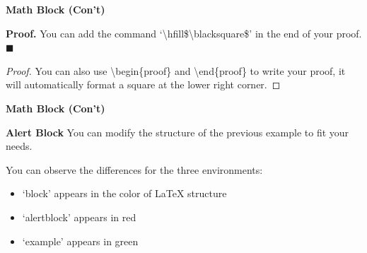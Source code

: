 \documentclass[12pt, aspectratio=169]{beamer}
\begin{document}

\linespread{1}
\begin{frame}{\textbf{Math Block (Con't)}}
\linespread{1.5} 

	\begin{block}{\textbf{Proof.}} 
		You can add the command `\textbackslash hfill\$\textbackslash blacksquare\$' in the end of your proof.
		\hfill$\blacksquare$
	\end{block}
	
	\begin{proof}
		You can also use \textbackslash{}begin\{proof\} and \textbackslash{}end\{proof\} to write your proof,
		it will automatically format a square at the lower right corner.
	\end{proof}
	
\end{frame}


\linespread{1}  
\begin{frame}{\textbf{Math Block (Con't)}}
\linespread{1.5} 

	\begin{alertblock}{\textbf{Alert Block}}
		You can modify the structure of the previous example to fit your needs.
	\end{alertblock}
	\label{Link Text} %
	
	\begin{example}
		You can observe the differences for the three environments:
		\begin{itemize}
			\item `block' appears in the color of LaTeX structure
			\item `alertblock'  appears in red
			\item `example' appears in green
		\end{itemize}
	\end{example}
	
\end{frame}

\end{document}
